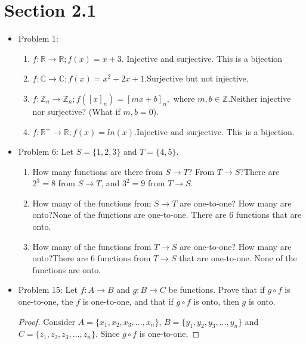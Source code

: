 \documentclass[hidelinks,12pt]{article}
\title{\scalebox{2}{Math 531 Homework 2}}
\author{\scalebox{1.5}{Theo Koss}}
\date{February 2021}
\newcommand{\C}{\mathbb{C}}
\newcommand{\R}{\mathbb{R}}
\newcommand{\Z}{\mathbb{Z}}
\begin{document}
\maketitle
\section{Section 2.1}
\begin{itemize}
    \item Problem 1:\begin{enumerate}[label=(\alph*)]
        \item $f:\R\to\R;f(x)=x+3$.
        \newline Injective and surjective. This is a bijection
        \item $f:\C\to\C;f(x)=x^2+2x+1$.\newline Surjective but not injective.
        \item $f:\Z_n\to\Z_n;f([x]_n)=[mx+b]_n,$ where $m,b\in\Z$.\newline Neither injective nor surjective? (What if $m,b=0$).
        \item $f:\R^+\to\R;f(x)=ln(x)$.\newline Injective and surjective. This is a bijection.
    \end{enumerate}
    \item Problem 6: Let $S=\{1,2,3\}$ and $T=\{4,5\}$.\begin{enumerate}[label=(\alph*)]
    \item How many functions are there from $S\to T$? From $T\to S$?\newline There are $2^3=8$ from $S\to T$, and $3^2=9$ from $T\to S$.
    \item How many of the functions from $S\to T$ are one-to-one? How many are onto?\newline None of the functions are one-to-one. There are 6 functions that are onto.
    \item How many of the functions from $T\to S$ are one-to-one? How many are onto?\newline There are 6 functions from $T\to S$ that are one-to-one. None of the functions are onto.
    \end{enumerate}
    \item Problem 15: Let $f:A\to B$ and $g:B\to C$ be functions. Prove that if $g\circ f$ is one-to-one, the $f$ is one-to-one, and that if $g\circ f$ is onto, then $g$ is onto. \begin{proof}
    Consider $A=\{x_1,x_2,x_3,...,x_n\}$, $B=\{y_1,y_2,y_3,...,y_n\}$ and $C=\{z_1,z_2,z_3,...,z_n\}$. Since $g\circ f$ is one-to-one, 
    \end{proof}
\end{itemize}
\end{document}
